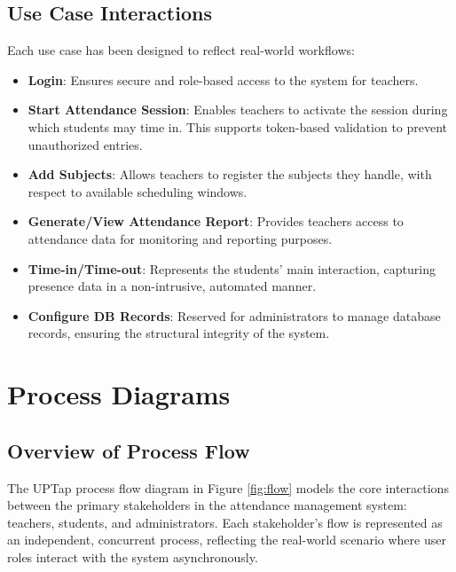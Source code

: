 \subsection*{Use Case Interactions}

Each use case has been designed to reflect real-world workflows:

\begin{itemize}
	\item \textbf{Login}: Ensures secure and role-based access to the system for teachers.
	\item \textbf{Start Attendance Session}: Enables teachers to activate the session during which students may time in. This supports token-based validation to prevent unauthorized entries.
	\item \textbf{Add Subjects}: Allows teachers to register the subjects they handle, with respect to available scheduling windows.
	\item \textbf{Generate/View Attendance Report}: Provides teachers access to attendance data for monitoring and reporting purposes.
	\item \textbf{Time-in/Time-out}: Represents the students’ main interaction, capturing presence data in a non-intrusive, automated manner.
	\item \textbf{Configure DB Records}: Reserved for administrators to manage database records, ensuring the structural integrity of the system.
\end{itemize}

\section{Process Diagrams }
\subsection{Overview of Process Flow}
The UPTap process flow diagram in Figure \ref{fig:flow} models the core interactions between the primary stakeholders in the attendance management system: teachers, students, and administrators. Each stakeholder's flow is represented as an independent, concurrent process, reflecting the real-world scenario where user roles interact with the system asynchronously.

